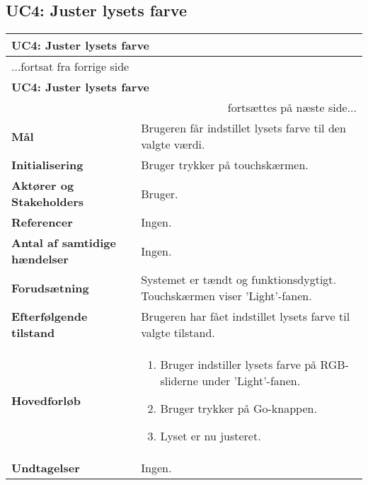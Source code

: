 \subsection{UC4: Juster lysets farve}

\begin{center} \centering
	\begin{longtable}{|p{6cm}|p{8cm}|}
	\hline
		\multicolumn{2}{|l|}{\textbf{UC4: Juster lysets farve}} \\\hline
		\endfirsthead
		
		\multicolumn{2}{l}{...fortsat fra forrige side} \\ \hline 
		\multicolumn{2}{|l|}{\textbf{UC4: Juster lysets farve}} \\\hline
		\endhead		

        \multicolumn{2}{r}{fortsættes på næste side...} \\
        \endfoot
        \endlastfoot
        
        \textbf{Mål}								
            & Brugeren får indstillet lysets farve til den valgte værdi.
        \\ \hline
        \textbf{Initialisering}					
            & Bruger trykker på touchskærmen.
        \\ \hline
        \textbf{Aktører og Stakeholders}			
            & Bruger.
        \\ \hline
        \textbf{Referencer}						
            & Ingen.
        \\ \hline
        \textbf{Antal af samtidige hændelser}	
            & Ingen.
        \\ \hline
        \textbf{Forudsætning}					
            & Systemet er tændt og funktionsdygtigt. Touchskærmen viser 'Light'-fanen.
        \\ \hline 
        \textbf{Efterfølgende tilstand}			
            & Brugeren har fået indstillet lysets farve til valgte tilstand.
        \\ \hline
        \textbf{Hovedforløb}						
            &
            \begin{enumerate}
                \item Bruger indstiller lysets farve på RGB-sliderne under 'Light'-fanen.
                \item Bruger trykker på Go-knappen.
                \item Lyset er nu justeret.
            \end{enumerate}
        \\ \hline
        \textbf{Undtagelser}						
            & Ingen.
        \\ \hline
	\end{longtable}
	\label{UC5} 
\end{center}